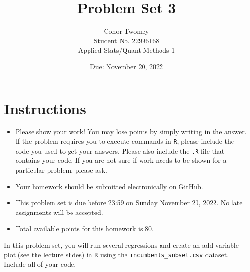 \documentclass[12pt,letterpaper]{article}
\title{Problem Set 3}
\date{Due: November 20, 2022}
\author{Conor Twomey\\ Student No. 22996168\\
	 Applied Stats/Quant Methods 1}
\begin{document}
	\maketitle
	\section*{Instructions}
	\begin{itemize}
		\item Please show your work! You may lose points by simply writing in the answer. If the problem requires you to execute commands in \texttt{R}, please include the code you used to get your answers. Please also include the \texttt{.R} file that contains your code. If you are not sure if work needs to be shown for a particular problem, please ask.
	\item Your homework should be submitted electronically on GitHub.
	\item This problem set is due before 23:59 on Sunday November 20, 2022. No late assignments will be accepted.
	\item Total available points for this homework is 80.
	\end{itemize}

		\vspace{.25cm}
	
\noindent In this problem set, you will run several regressions and create an add variable plot (see the lecture slides) in \texttt{R} using the \texttt{incumbents\_subset.csv} dataset. Include all of your code.

	\vspace{10cm}
	
\end{document}
